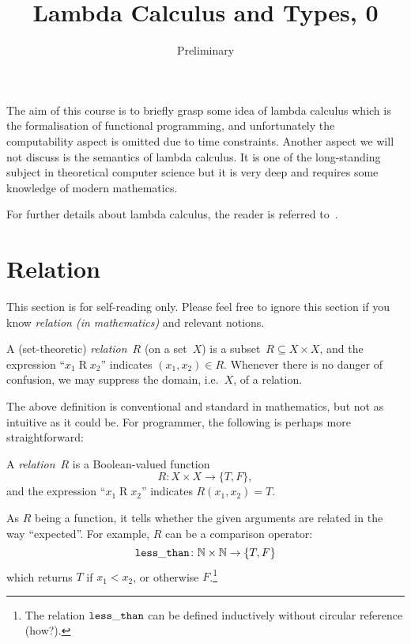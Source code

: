\title{Lambda Calculus and Types, 0}
\subtitle{Preliminary}

\begin{frame}
\maketitle
\end{frame}

The aim of this course is to briefly grasp some idea of lambda
calculus which is the formalisation of functional programming, and unfortunately
the computability aspect is omitted due to time constraints. Another aspect we
will not discuss is the semantics of lambda calculus. It is one of the
long-standing subject in theoretical computer science but it is very deep
and requires some knowledge of modern mathematics. 

For further details about lambda calculus, the reader is referred
to~\cite{Barendregt1984,Barendregt1992,Barendregt1984a}. 

\section{Relation}
This section is for self-reading only. Please feel free to ignore this section
if you know \emph{relation (in mathematics)} and relevant notions.

\begin{definition}
  A (set-theoretic) \emph{relation}~$R$ (on a set~$X$) is a subset~$R
  \subseteq X \times X$, and the expression ``$x_1 \mathbin{R} x_2$'' indicates
  $(x_1, x_2) \in R$.  Whenever there is no danger of confusion, we may suppress
  the domain, i.e.\ $X$, of a relation. 
\end{definition}

The above definition is conventional and standard in mathematics, but not as
intuitive as it could be. For programmer, the following is perhaps more
straightforward:
\begin{definition}[Functional]
  A \emph{relation}~$R$ is a Boolean-valued function 
  \[
    R\colon X \times X \to \{T, F\},
  \]
  and the expression ``$x_1 \mathbin{R} x_2$'' indicates $R(x_1, x_2) = T$.
\end{definition}

As $R$ being a function, it tells whether the given arguments are related in the
way ``expected''. For example, $R$ can be a comparison operator:
\[
  {\tt less\_than}\colon \mathbb{N} \times \mathbb{N} \to \{T, F\}
\]
which returns $T$ if $x_1 < x_2$, or otherwise $F$.\footnote{%
  The relation ${\tt less\_than}$ can be defined inductively without circular
  reference (how?).}

